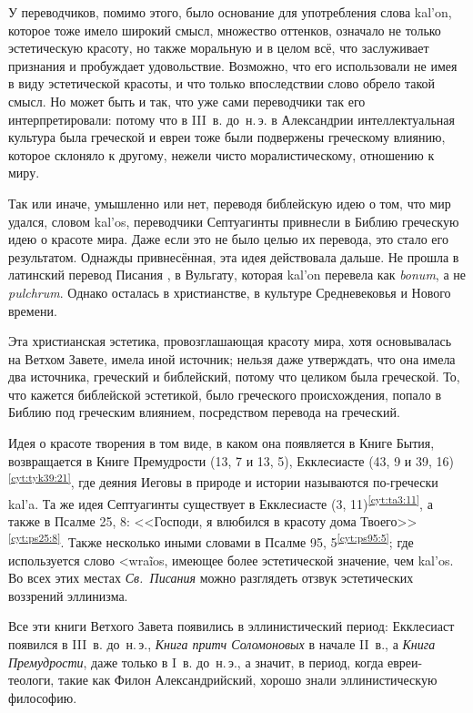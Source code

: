 У переводчиков, помимо этого, было основание для употребления слова \textgreek{kal'on}, которое тоже имело широкий смысл, множество оттенков, означало не только эстетическую красоту, но также моральную и в целом всё, что заслуживает признания и пробуждает удовольствие. Возможно, что его использовали не имея в виду эстетической красоты, и что только впоследствии слово обрело такой смысл. Но может быть и так, что уже сами переводчики так его интерпретировали: потому что в III~в. до~н.\,э. в Александрии интеллектуальная культура была греческой и евреи тоже были подвержены греческому влиянию, которое склоняло к другому, нежели чисто моралистическому, отношению к миру.

Так или иначе, умышленно или нет, переводя библейскую идею о том, что мир удался, словом \textgreek{kal'os}, переводчики Септуагинты привнесли в Библию греческую идею о красоте мира. Даже если это не было целью их перевода, это стало его результатом. Однажды привнесённая, эта идея действовала дальше. Не прошла в латинский перевод Писания , в Вульгату, которая \textgreek{kal'on} перевела как {\sl bonum}, а не {\sl pulchrum}. Однако осталась в христианстве, в культуре Средневековья и Нового времени.

Эта христианская эстетика, провозглашающая красоту мира, хотя основывалась на Ветхом Завете, имела иной источник; нельзя даже утверждать, что она имела два источника, греческий и библейский, потому что целиком была греческой. То, что кажется библейской эстетикой, было греческого происхождения, попало в Библию под греческим влиянием, посредством перевода на греческий.

Идея о красоте творения в том виде, в каком  она появляется в Книге Бытия, возвращается в Книге Премудрости (13, 7 и 13, 5), Екклесиасте (43, 9 и 39, 16)\textsuperscript{\ref{cyt:tyk39:21}}, где деяния Иеговы в природе и истории называются по-гречески \textgreek{kal'a}. Та же идея Септуагинты существует в Екклесиасте (3, 11)\textsuperscript{\ref{cyt:ta3:11}}, а также в Псалме 25, 8: <<Господи, я влюбился в красоту дома Твоего>>\textsuperscript{\ref{cyt:ps25:8}}. Также несколько иными словами в Псалме 95, 5\textsuperscript{\ref{cyt:ps95:5}}; где используется слово \textgreek{<wra\~ios}, имеющее более эстетической значение, чем \textgreek{kal'os}. Во всех этих местах \emph{Св.~Писания} можно разглядеть отзвук эстетических воззрений эллинизма.

Все эти книги Ветхого Завета появились в эллинистический период: Екклесиаст появился в III~в. до~н.\,э., \emph{Книга притч Соломоновых} в начале II~в., а \emph{Книга Премудрости}, даже только в I~в. до~н.\,э., а значит, в период, когда евреи-теологи, такие как Филон Александрийский, хорошо знали эллинистическую философию.

